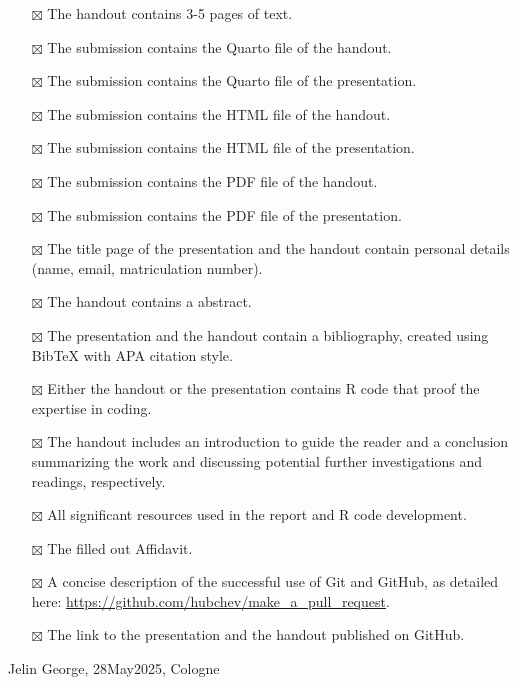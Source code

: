 \documentclass[
  man,
  floatsintext,
  longtable,
  nolmodern,
  notxfonts,
  notimes,
  colorlinks=true,linkcolor=blue,citecolor=blue,urlcolor=blue]{apa7}
\providecommand{\tightlist}{%
  \setlength{\itemsep}{0pt}\setlength{\parskip}{0pt}}
\begin{document}
\begin{itemize}
\tightlist
\item[$\boxtimes$]
  The handout contains 3-5 pages of text.
\item[$\boxtimes$]
  The submission contains the Quarto file of the handout.
\item[$\boxtimes$]
  The submission contains the Quarto file of the presentation.
\item[$\boxtimes$]
  The submission contains the HTML file of the handout.
\item[$\boxtimes$]
  The submission contains the HTML file of the presentation.
\item[$\boxtimes$]
  The submission contains the PDF file of the handout.
\item[$\boxtimes$]
  The submission contains the PDF file of the presentation.
\item[$\boxtimes$]
  The title page of the presentation and the handout contain personal
  details (name, email, matriculation number).
\item[$\boxtimes$]
  The handout contains a abstract.
\item[$\boxtimes$]
  The presentation and the handout contain a bibliography, created using
  BibTeX with APA citation style.
\item[$\boxtimes$]
  Either the handout or the presentation contains R code that proof the
  expertise in coding.
\item[$\boxtimes$]
  The handout includes an introduction to guide the reader and a
  conclusion summarizing the work and discussing potential further
  investigations and readings, respectively.
\item[$\boxtimes$]
  All significant resources used in the report and R code development.
\item[$\boxtimes$]
  The filled out Affidavit.
\item[$\boxtimes$]
  A concise description of the successful use of Git and GitHub, as
  detailed here: \url{https://github.com/hubchev/make_a_pull_request}.
\item[$\boxtimes$]
  The link to the presentation and the handout published on GitHub.
\end{itemize}

Jelin George, 28May2025, Cologne
\end{document}

